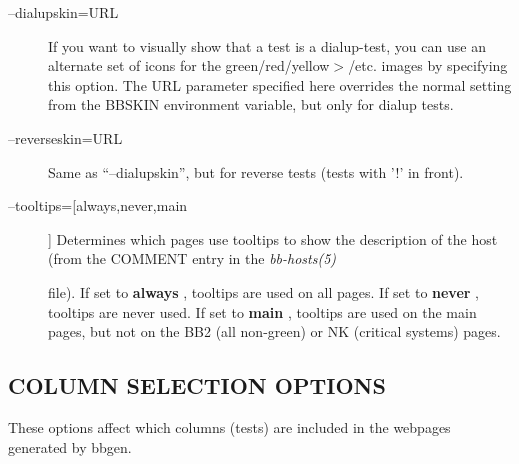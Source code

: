 \begin{description}
 

\item[--dialupskin=URL] If you want to visually show that a test is a
  dialup-test, you can use an alternate set of icons for the
  green/red/yellow$>$/etc. images by specifying this option. The URL
  parameter specified here overrides the normal setting from the
  BBSKIN environment variable, but only for dialup tests. 


 

\item[--reverseskin=URL] Same as ``--dialupskin'', but for reverse tests (tests with '!' in front). 

 

\item[--tooltips=[always,never,main]] Determines which pages use
  tooltips to show the description of the host (from the COMMENT entry
  in the \emph{bb-hosts(5)}

 file). If set to \textbf{always}
, tooltips are used on all pages. If set to \textbf{never}
, tooltips are never used. If set to \textbf{main}
, tooltips are used on the main pages, but not on the BB2 (all non-green) or NK (critical systems) pages. 

 


\end{description}

\subsection{COLUMN SELECTION OPTIONS}
 These options affect which columns (tests) are included in the webpages generated by bbgen. 

